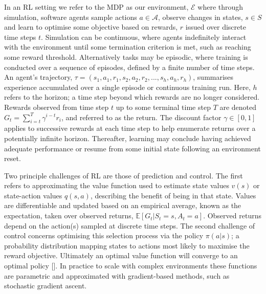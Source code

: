 \documentclass[conference,compsoc]{IEEEtran}
\begin{document}
In an RL setting we refer to the MDP as our environment, $\mathcal{E}$ where through simulation, software agents sample actions $a \in \mathcal{A}$, observe changes in states, $s \in S$ and learn to optimise some objective based on rewards, $r$ issued over discrete time steps $t$. Simulation can be continuous, where agents indefinitely interact with the environment until some termination criterion is met, such as reaching some reward threshold. Alternatively tasks may be episodic, where training is conducted over a sequence of episodes, defined by a finite number of time steps. An agent's trajectory, $\tau = (s_1, a_1, r_1,  s_2, a_2, r_2,...,s_h, a_h, r_h)$, summarises experience accumulated over a single episode or continuous training run. Here, $h$ refers to the horizon; a time step beyond which rewards are no longer considered. Rewards observed from time step $t$ up to some terminal time step $T$ are denoted $G_{t} = \sum_{i=t}^{T}\gamma^{i-t}r_{i}$, and referred to as the return. The discount factor $\gamma \in [0,1]$ applies to successive rewards at each time step to help enumerate returns over a potentially infinite horizon. Thereafter, learning may conclude having achieved adequate performance or resume from some initial state following an environment reset.


Two principle challenges of RL are those of prediction and control. The first refers to approximating the value function used to estimate state values $v(s)$ or state-action values $q(s,a)$, describing the benefit of being in that state. Values are differentiable and updated based on an empirical average, known as the expectation, taken over observed returns, $\mathbb{E}[G_t | S_t = s, A_t = a]$. Observed returns depend on the action(s) sampled at discrete time steps. The second challenge of control concerns optimising this selection process via the policy $\pi(a|s)$; a probability distribution mapping states to actions most likely to maximise the reward objective. Ultimately an optimal value function will converge to an optimal policy []. In practice to scale with complex environments these functions are parametric and approximated with gradient-based methods, such as stochastic gradient ascent.
\end{document}
